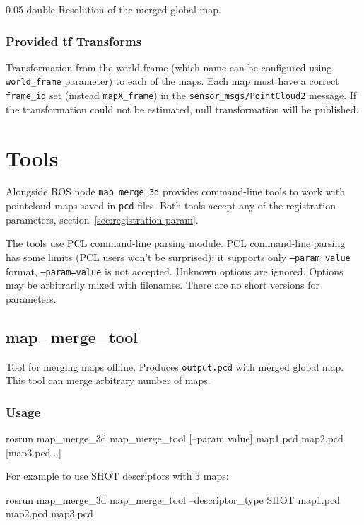 {0.05}
{double}
{Resolution of the merged global map.}

\subsubsection{Provided tf Transforms}

{Transformation from the world frame (which name can be configured using \texttt{world\_frame} parameter) to each of the maps. Each map must have a correct \texttt{frame\_id} set (instead \texttt{mapX\_frame}) in the \texttt{sensor\_msgs/PointCloud2} message. If the transformation could not be estimated, null transformation will be published.}

\section{Tools}

Alongside ROS node \texttt{map\_merge\_3d} provides command-line tools to work with pointcloud maps saved in \texttt{pcd} files. Both tools accept any of the registration parameters, section~\ref{sec:registration-param}.

The tools use PCL command-line parsing module. PCL command-line parsing has some limits (PCL users won't be surprised): it supports only \texttt{--param value} format, \texttt{--param=value} is not accepted. Unknown options are ignored. Options may be arbitrarily mixed with filenames. There are no short versions for parameters.

\subsection{map\_merge\_tool}

Tool for merging maps offline. Produces \texttt{output.pcd} with merged global map. This tool can merge arbitrary number of maps.

\subsubsection{Usage}

\begin{code}
rosrun map_merge_3d map_merge_tool [--param value] map1.pcd
map2.pcd [map3.pcd...]
\end{code}

For example to use SHOT descriptors with 3 maps:

\begin{code}
rosrun map_merge_3d map_merge_tool --descriptor_type SHOT map1.pcd
map2.pcd map3.pcd
\end{code}

